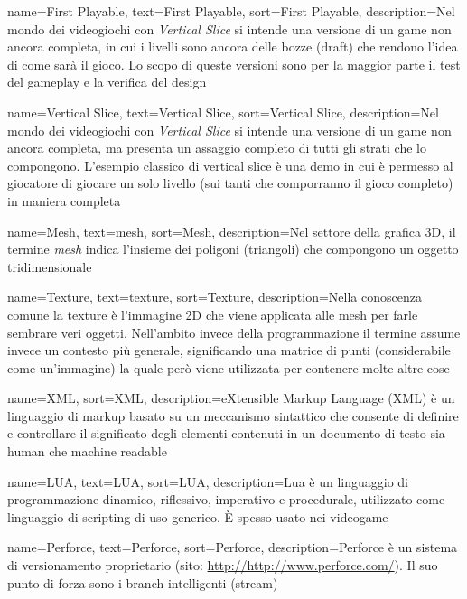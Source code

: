 {
	name=First Playable,
	text=First Playable,
	sort=First Playable,
	description={Nel mondo dei videogiochi con \emph{Vertical Slice} si intende una versione di un game non ancora completa, in cui i livelli sono ancora delle bozze (draft) che rendono l'idea di come sarà il gioco. Lo scopo di queste versioni sono per la maggior parte il test del gameplay e la verifica del design}
}

{
	name=Vertical Slice,
	text=Vertical Slice,
	sort=Vertical Slice,
	description={Nel mondo dei videogiochi con \emph{Vertical Slice} si intende una versione di un game non ancora completa, ma presenta un assaggio completo di tutti gli strati che lo compongono. L'esempio classico di vertical slice è una demo in cui è permesso al giocatore di giocare un solo livello (sui tanti che comporranno il gioco completo) in maniera completa}
}

{
	name=Mesh,
	text=mesh,
	sort=Mesh,
	description={Nel settore della grafica 3D, il termine \emph{mesh} indica l'insieme dei poligoni (triangoli) che compongono un oggetto tridimensionale}
}

{
	name=Texture,
	text=texture,
	sort=Texture,
	description={Nella conoscenza comune la texture è l'immagine 2D che viene applicata alle mesh per farle sembrare veri oggetti. Nell'ambito invece della programmazione il termine assume invece un contesto più generale, significando una matrice di punti (considerabile come un'immagine) la quale però viene utilizzata per contenere molte altre cose}
}

{
	name=XML,
	sort=XML,
	description={eXtensible Markup Language (XML) è un linguaggio di markup basato su un meccanismo sintattico che consente di definire e controllare il significato degli elementi contenuti in un documento di testo sia human che machine readable}
}

{
	name=LUA,
	text=LUA,
	sort=LUA,
	description={Lua è un linguaggio di programmazione dinamico, riflessivo, imperativo e procedurale, utilizzato come linguaggio di scripting di uso generico. È spesso usato nei videogame}
}

{
	name=Perforce\textsuperscript{\textregistered},
	text=Perforce\textsuperscript{\textregistered},
	sort=Perforce,
	description={Perforce\textsuperscript{\textregistered} è un sistema di versionamento proprietario (sito: \url{http://http://www.perforce.com/}). Il suo punto di forza sono i branch intelligenti (stream)}
}

